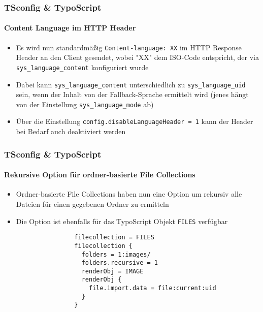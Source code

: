 \begin{frame}[fragile]
	\frametitle{TSconfig \& TypoScript}
	\framesubtitle{Content Language im HTTP Header}

	\begin{itemize}

		\item Es wird nun standardmäßig \texttt{Content-language: XX} im HTTP Response Header an den Client gesendet,
			wobei "XX" dem ISO-Code entspricht, der via \texttt{sys\_language\_content} konfiguriert wurde

		\item Dabei kann \texttt{sys\_language\_content} unterschiedlich zu \texttt{sys\_language\_uid} sein,
			wenn der Inhalt von der Fallback-Sprache ermittelt wird\newline
			\small(jenes hängt von der Einstellung \texttt{sys\_language\_mode} ab)\normalsize

		\item Über die Einstellung \texttt{config.disableLanguageHeader = 1} kann der Header bei Bedarf auch deaktiviert werden

	\end{itemize}

\end{frame}


\begin{frame}[fragile]
	\frametitle{TSconfig \& TypoScript}
	\framesubtitle{Rekursive Option für ordner-basierte File Collections}

	\begin{itemize}

		\item Ordner-basierte File Collections haben nun eine Option um rekursiv alle Dateien für einen
			gegebenen Ordner zu ermitteln

		\item Die Option ist ebenfalls für das TypoScript Objekt \texttt{FILES} verfügbar

			\begin{lstlisting}
				filecollection = FILES
				filecollection {
				  folders = 1:images/
				  folders.recursive = 1
				  renderObj = IMAGE
				  renderObj {
				    file.import.data = file:current:uid
				  }
				}
			\end{lstlisting}

	\end{itemize}

\end{frame}


